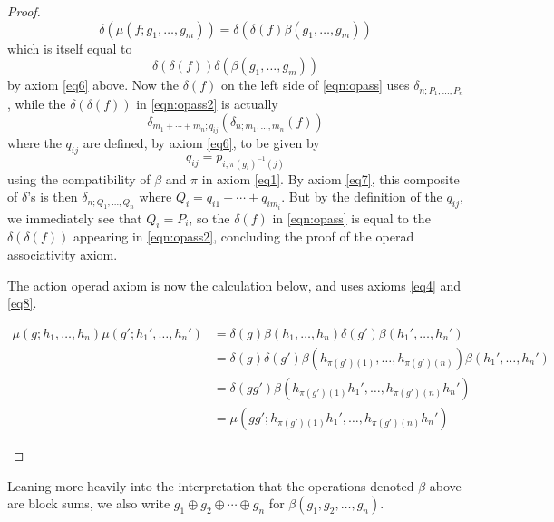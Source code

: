 \documentclass{amsbook} %
\newenvironment{eqn}{\begin{equation}}{\end{equation}}
\numberwithin{section}{chapter}
\begin{document}
\begin{proof}
  \[
    \delta(\mu (f; g_{1}, \ldots, g_{m})) = \delta\left(\delta(f)\beta(g_{1}, \ldots, g_{m}) \right)
  \]
which is itself equal to
\begin{eqn}\label{eqn:opass2}
\delta\left(\delta(f)\right) \delta\left(\beta(g_{1}, \ldots, g_{m})\right)
\end{eqn}by axiom \eqref{eq6} above.  Now the $\delta(f)$ on the left side of \cref{eqn:opass} uses $\delta_{n; P_{1}, \ldots, P_{n}}$, while the $\delta(\delta(f))$ in \cref{eqn:opass2} is actually
  \[
    \delta_{m_1 + \cdots + m_{n}; q_{ij}}(\delta_{n; m_{1}, \ldots, m_{n}} (f))
  \]
where the $q_{ij}$ are defined, by axiom \eqref{eq6}, to be given by
  \[
    q_{ij} = p_{i,\pi(g_{i})^{-1}(j)}
  \]
using the compatibility of $\beta$ and $\pi$ in axiom \eqref{eq1}.  By axiom \eqref{eq7}, this composite of $\delta$'s  is then $\delta_{n; Q_{1}, \ldots, Q_{n}}$ where $Q_{i} = q_{i1} + \cdots + q_{im_{i}}$.  But by the definition of the $q_{ij}$, we immediately see that $Q_{i} = P_{i}$, so the $\delta(f)$ in \cref{eqn:opass} is equal to the $\delta(\delta(f))$ appearing in \cref{eqn:opass2}, concluding the proof of the operad associativity axiom.

The action operad axiom is now the calculation below, and uses axioms \eqref{eq4} and \eqref{eq8}.
\begin{small}
  \begin{align*}
    \mu\left(g; h_{1}, \ldots, h_{n}\right)\mu\left(g'; h_{1}', \ldots, h_{n}'\right) &= \delta\left(g\right) \beta\left(h_{1}, \ldots, h_{n}\right) \delta\left(g'\right) \beta\left(h_{1}', \ldots, h_{n}'\right) \\
    &= \delta\left(g\right) \delta\left(g'\right) \beta\left(h_{\pi\left(g'\right)(1)}, \ldots, h_{\pi\left(g'\right)(n)}\right)  \beta\left(h_{1}', \ldots, h_{n}'\right) \\
    &= \delta\left(gg'\right) \beta\left(h_{\pi\left(g'\right)(1)}h_{1}', \ldots, h_{\pi\left(g'\right)(n)}h_{n}'\right) \\
    &= \mu\left(gg'; h_{\pi\left(g'\right)(1)}h_{1}', \ldots, h_{\pi\left(g'\right)(n)}h_{n}'\right)
  \end{align*}
\end{small}
\end{proof}

\begin{nota}\label{beta_to_oplus}
Leaning more heavily into the interpretation that the operations denoted $\beta$ above are block sums, we also write $g_1 \oplus g_2 \oplus \cdots \oplus g_n$ for
$\beta(g_1, g_2, \ldots, g_n)$.
\end{nota}
\end{document}
